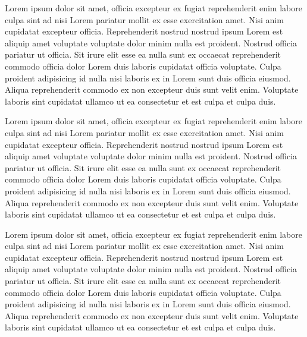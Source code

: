 Lorem ipsum dolor sit amet, officia excepteur ex fugiat reprehenderit enim
labore culpa sint ad nisi Lorem pariatur mollit ex esse exercitation amet. Nisi
anim cupidatat excepteur officia. Reprehenderit nostrud nostrud ipsum Lorem est
aliquip amet voluptate voluptate dolor minim nulla est proident. Nostrud officia
pariatur ut officia. Sit irure elit esse ea nulla sunt ex occaecat reprehenderit
commodo officia dolor Lorem duis laboris cupidatat officia voluptate. Culpa
proident adipisicing id nulla nisi laboris ex in Lorem sunt duis officia
eiusmod. Aliqua reprehenderit commodo ex non excepteur duis sunt velit enim.
Voluptate laboris sint cupidatat ullamco ut ea consectetur et est culpa et
culpa duis.

Lorem ipsum dolor sit amet, officia excepteur ex fugiat reprehenderit enim
labore culpa sint ad nisi Lorem pariatur mollit ex esse exercitation amet. Nisi
anim cupidatat excepteur officia. Reprehenderit nostrud nostrud ipsum Lorem est
aliquip amet voluptate voluptate dolor minim nulla est proident. Nostrud officia
pariatur ut officia. Sit irure elit esse ea nulla sunt ex occaecat reprehenderit
commodo officia dolor Lorem duis laboris cupidatat officia voluptate. Culpa
proident adipisicing id nulla nisi laboris ex in Lorem sunt duis officia
eiusmod. Aliqua reprehenderit commodo ex non excepteur duis sunt velit enim.
Voluptate laboris sint cupidatat ullamco ut ea consectetur et est culpa et
culpa duis.

Lorem ipsum dolor sit amet, officia excepteur ex fugiat reprehenderit enim
labore culpa sint ad nisi Lorem pariatur mollit ex esse exercitation amet. Nisi
anim cupidatat excepteur officia. Reprehenderit nostrud nostrud ipsum Lorem est
aliquip amet voluptate voluptate dolor minim nulla est proident. Nostrud officia
pariatur ut officia. Sit irure elit esse ea nulla sunt ex occaecat reprehenderit
commodo officia dolor Lorem duis laboris cupidatat officia voluptate. Culpa
proident adipisicing id nulla nisi laboris ex in Lorem sunt duis officia
eiusmod. Aliqua reprehenderit commodo ex non excepteur duis sunt velit enim.
Voluptate laboris sint cupidatat ullamco ut ea consectetur et est culpa et
culpa duis.

\newpage
\printbibliography



